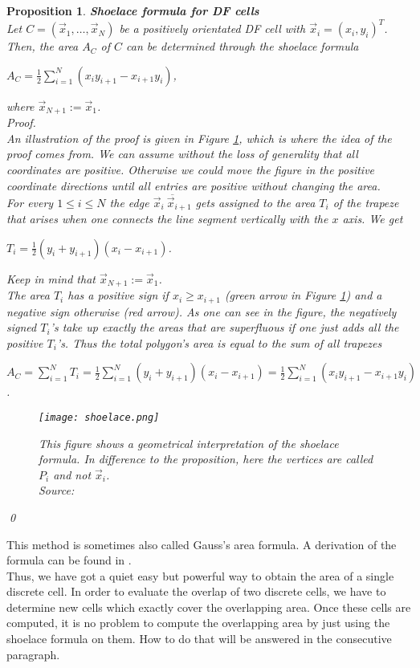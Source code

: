 \documentclass[a4paper,12pt,leqno]{article}
\theoremstyle{plain}
\newtheorem{proposition}[theorem]{Proposition}
\theoremstyle{remark}
\begin{document}
\begin{proposition}  \textbf{Shoelace formula for DF cells} \label{prop:Shoelace}\\ 
	Let $C = (\vec{x}_1, \ldots, \vec{x}_N)$ be a positively orientated DF cell with $\vec{x}_i = (x_i, y_i)^T$.
	Then, the area $A_C$ of $C$ can be determined through the shoelace formula
	\begin{center}
		$A_C = \frac{1}{2}\sum\limits_{i = 1}^{N} (x_i y_{i+1} - x_{i+1} y_i)$,
	\end{center} 
	where $\vec{x}_{N + 1} := \vec{x}_1$. \\
	Proof. 	\\
	An illustration of the proof is given in Figure \ref{fig:shoelace}, which is where the idea of the proof comes from. We can assume without the loss of generality that all coordinates are positive. Otherwise we could move the figure in the positive coordinate directions until all entries are positive without changing the area. \\
	For every $1 \leq i \leq N$ the edge $\overline{ \vec{x}_i \: \vec{x}_{i+1}}$ gets assigned to the area $T_i$ of the trapeze that arises when one connects the line segment vertically with the $x$ axis. We get
	\begin{center}
		$T_i = \frac{1}{2} (y_i + y_{i+1})(x_i - x_{i+1})$.
	\end{center}
	Keep in mind that $\vec{x}_{N + 1} := \vec{x}_1$. \\
	The area $T_i$ has a positive sign if $x_i \geq x_{i+1}$ (green arrow in Figure \ref{fig:shoelace}) and a negative sign otherwise (red arrow). As one can see in the figure, the negatively signed $T_i$'s take up exactly the areas that are superfluous if one just adds all the positive $T_i$'s. 
	Thus the total polygon's area is equal to the sum of all trapezes
	\begin{center}
		$A_C = \sum\limits_{i = 1}^{N} T_i = \frac{1}{2} \sum\limits_{i = 1}^{N} (y_i + y_{i+1})(x_i - x_{i+1}) = \frac{1}{2}\sum\limits_{i = 1}^{N} (x_i y_{i+1} - x_{i+1} y_i) $.
	\end{center} 
	\begin{figure}[h!]
		\begin{center}
			\texttt{[image: shoelace.png]}
			\caption{
				This figure shows a geometrical interpretation of the shoelace formula. In difference to the proposition, here the vertices are called $P_i$ and not $\vec{x}_i$. \\
				Source: \cite{ShoelaceFigure2022}}
			\label{fig:shoelace}
		\end{center}
	\end{figure}
	\qed
\end{proposition}
This method is sometimes also called Gauss's area formula. A derivation of the formula can be found in \cite{Shoelace2014}. \\
Thus, we have got a quiet easy but powerful way to obtain the area of a single discrete cell. In order to evaluate the overlap of two discrete cells, we have to determine new cells which exactly cover the overlapping area. Once these cells are computed, it is no problem to compute the overlapping area by just using the shoelace formula on them. How to do that will be answered in the consecutive paragraph.
\end{document}
